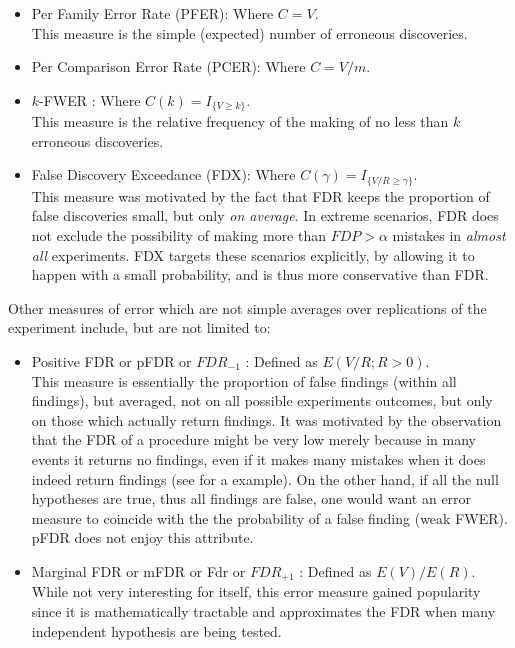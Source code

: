 \documentclass[review,12pt]{article}
\begin{document}
\begin{itemize}

\item Per Family Error Rate (PFER): Where $C=V$.\\
This measure is the simple (expected) number of erroneous discoveries. 

\item Per Comparison Error Rate (PCER): Where $C=V/m$.

\item $k$-FWER \citep{van_der_laan_augmentation_2004}: Where $C(k) = I_{\{ V \geq k \} }$.\\
This measure is the relative frequency of the making of no less than $k$ erroneous discoveries.

\item False Discovery Exceedance (FDX)\citep{genovese_exceedance_2006}: Where $C(\gamma) = I_{\{ V/R \geq \gamma \} }$.\\
This measure was motivated by the fact that FDR keeps the proportion of false discoveries small, but only \emph{on average}. 
In extreme scenarios, FDR does not exclude the possibility of making more than $FDP>\alpha$ mistakes in \emph{almost all} experiments. FDX targets these scenarios explicitly, by allowing it to happen with a small probability, and is thus more conservative than FDR. 

\end{itemize}



Other measures of error which are not simple averages over replications of the experiment include, but are not limited to:
\begin{itemize}

\item Positive FDR or pFDR \citep{storey_direct_2002} or $FDR_{-1}$ \citep{benjamini_discovering_2010} : Defined as $E(V/R;R>0)$.\\
This measure is essentially the proportion of false findings (within all findings), but averaged, not on all possible experiments outcomes, but only on those which actually return findings. It was motivated by the observation that the FDR of a procedure might be very low merely because in many events it returns no findings, even if it makes many mistakes when it does indeed return findings (see \citep{storey_direct_2002} for a example). 
On the other hand, if all the null hypotheses are true, thus all findings are false, one would want an error measure to coincide with the the probability of a false finding (weak FWER). pFDR does not enjoy this attribute.

\item Marginal FDR or mFDR \citep{sun_oracle_2007} or Fdr \citep{efron_microarrays_2008} or $FDR_{+1}$ \citep{benjamini_discovering_2010}: Defined as $E(V)/E(R)$. \\
While not very interesting for itself, this error measure gained popularity since it is mathematically tractable and approximates the FDR when many independent hypothesis are being tested. 

\end{itemize}
\end{document}
